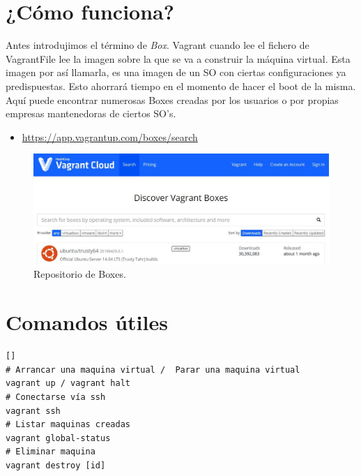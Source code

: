 \section{¿Cómo funciona?}
Antes introdujimos el término de \textit{Box}. Vagrant cuando lee el fichero de VagrantFile lee la imagen sobre la que se va a construir la máquina virtual. Esta imagen por así llamarla, es una imagen de un SO con ciertas configuraciones ya predispuestas. Esto ahorrará tiempo en el momento de hacer el boot de la misma. Aquí puede encontrar numerosas Boxes creadas por los usuarios o por propias empresas mantenedoras de ciertos SO's.
\begin{itemize}
    \item \url{https://app.vagrantup.com/boxes/search}
\end{itemize}
\begin{figure}[!htb]
  \centering
    \includegraphics[width=0.7\linewidth]{./img/anexos/2.JPG}
    \caption{Repositorio de Boxes.}
  \label{fig:yo}
\end{figure}

\section{Comandos útiles}
\begin{verbatim}[]
# Arrancar una maquina virtual /  Parar una maquina virtual
vagrant up / vagrant halt
# Conectarse vía ssh
vagrant ssh
# Listar maquinas creadas
vagrant global-status
# Eliminar maquina 
vagrant destroy [id]
\end{verbatim}








